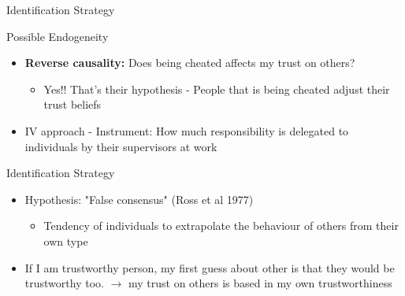 \documentclass[pdftex,12pt,xcolor=pdftex,table]{beamer}
\begin{document}
\begin{frame}{Identification Strategy}
    \begin{center}
        \begin{description}
         \Large \item[Possible Endogeneity]
        \end{description}
    \end{center}
    \begin{itemize}
        \item \textbf{Reverse causality:} Does being cheated affects my trust on others? 
           \begin{itemize}
               \item Yes!! That's their hypothesis - People that is being cheated adjust their trust beliefs
           \end{itemize} \pause
        \item IV approach - Instrument: How much responsibility is delegated to individuals by their supervisors at work
    \end{itemize}
\end{frame}
\begin{frame}{Identification Strategy}
    \begin{center}
        \begin{description}
         \Large \item[Instrument Justification]
        \end{description}
    \end{center}
    \begin{itemize}
        \item Hypothesis: "False consensus" (Ross et al 1977)
            \begin{itemize}
                \item Tendency of individuals to extrapolate the behaviour of others from their own type
            \end{itemize}
        \item If I am trustworthy person, my first guess about other is that they would be trustworthy too. $\to$ my trust on others is based in my own trustworthiness 
    \end{itemize}
\end{frame}
\end{document}
